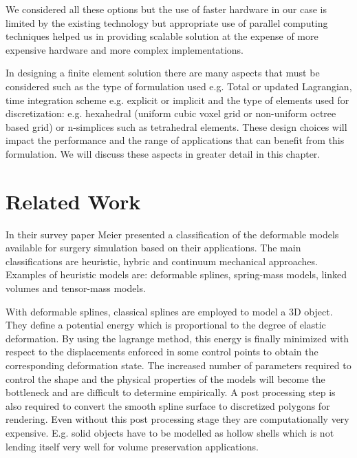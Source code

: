 We considered all these options but the use of faster hardware in our case is limited by the existing technology but appropriate 
use of parallel computing techniques helped us in providing scalable solution at the expense of more expensive hardware and more 
complex implementations.


In designing a finite element solution there are many aspects that must be considered such as the type of formulation used e.g.
Total or updated Lagrangian, time integration scheme e.g. explicit or implicit and the type of elements used for discretization:
e.g. hexahedral (uniform cubic voxel grid or non-uniform octree based grid) or n-simplices such as tetrahedral elements. 
These design choices will impact the performance and the range of applications that can benefit from this formulation.
We will discuss these aspects in greater detail in this chapter. 


\section{Related Work}
In their survey paper Meier \etal \cite{Meier2005} presented a classification of the deformable models available for surgery 
simulation based on their applications. The main classifications are heuristic, hybric and continuum mechanical approaches.
Examples of heuristic models are: deformable splines, spring-mass models, linked volumes and tensor-mass models. 

With deformable splines, classical splines are employed to model a 3D object. They define a potential energy which is proportional
to the degree of elastic deformation. By using the lagrange method, this energy is finally minimized with respect to the displacements
enforced in some control points to obtain the corresponding deformation state. The increased number of parameters required to control
the shape and the physical properties of the models will become the bottleneck and are difficult to determine empirically. A post processing
step is also required to convert the smooth spline surface to discretized polygons for rendering. Even without this post processing stage
they are computationally very expensive. E.g. solid objects have to be modelled as hollow shells which is not lending itself very well for
volume preservation applications.

